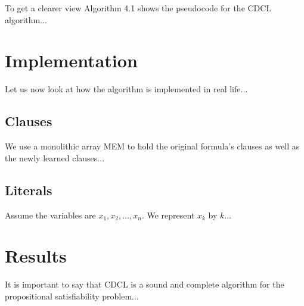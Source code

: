 To get a clearer view Algorithm 4.1 shows the pseudocode for the CDCL algorithm...

\section{Implementation}

Let us now look at how the algorithm is implemented in real life...

\subsection{Clauses}

We use a monolithic array MEM to hold the original formula’s clauses as well as the newly learned clauses...

\subsection{Literals}

Assume the variables are \(x_1, x_2, \ldots, x_n\). We represent \(x_k\) by \(k\)...

\section{Results}

It is important to say that CDCL is a sound and complete algorithm for the propositional satisfiability problem...
